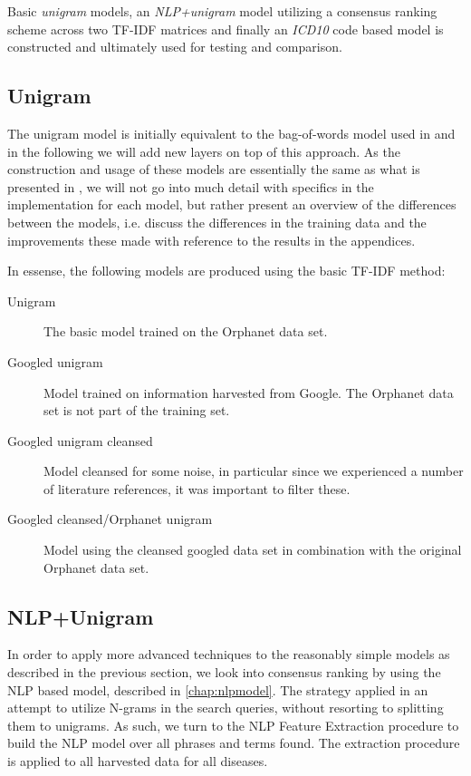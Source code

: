 \documentclass[10pt,letterpaper,final]{article}
\begin{document}
Basic \textit{unigram} models, an \textit{NLP+unigram} model utilizing a
consensus ranking scheme across two TF-IDF matrices and finally an
\textit{ICD10} code based model is constructed and ultimately used for
testing and comparison.


\subsection{Unigram}
\label{chap:unigrammethod}
The unigram model is initially equivalent to the bag-of-words model used in
\cite{jensenandersen} and in the following we will add new layers on top of this
approach. As the construction and usage of these models are essentially
the same as what is presented in \cite{jensenandersen}, we will not go
into much detail with specifics in the implementation for each model,
but rather present an overview of the differences between the models,
i.e. discuss the differences in the training data and the improvements
these made with reference to the results in the appendices.

In essense, the following models are produced using the basic TF-IDF
method:

\begin{description}
\item[Unigram] The basic model trained on the Orphanet data set.
\item[Googled unigram] Model trained on information harvested from
Google. The Orphanet data set is not part of the training set.
\item[Googled unigram cleansed] Model cleansed for some noise, in
particular since we experienced a number of literature references, it
was important to filter these.
\item[Googled cleansed/Orphanet unigram] Model using the cleansed
googled data set in combination with the original Orphanet data set.
\end{description}



\subsection{NLP+Unigram}
In order to apply more advanced techniques to the reasonably simple
models as described in the previous section, we look into consensus
ranking by using the NLP based model, described in \ref{chap:nlpmodel}.
The strategy applied in an attempt to utilize N-grams in the search
queries, without resorting to splitting them to unigrams. As such, we
turn to the NLP Feature Extraction procedure to build the NLP model over
all phrases and terms found. The extraction procedure is applied to
all harvested data for all diseases.
\end{document}
